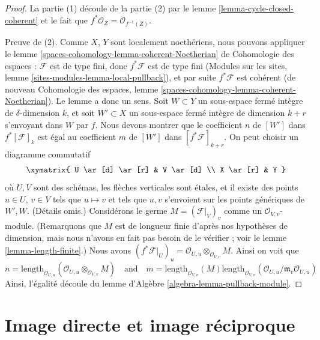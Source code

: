 \begin{proof}
La partie (1) découle de la partie (2) par le lemme
\ref{lemma-cycle-closed-coherent} et le fait que $f^*\mathcal{O}_Z =
\mathcal{O}_{f^{-1}(Z)}$.

\medskip\noindent
Preuve de (2). Comme $X$, $Y$ sont localement noethériens, nous pouvons
appliquer le lemme
\ref{spaces-cohomology-lemma-coherent-Noetherian} de Cohomologie des espaces :
$\mathcal{F}$ est de type fini, donc $f^*\mathcal{F}$ est de type fini (Modules
sur les sites, lemme \ref{sites-modules-lemma-local-pullback}), et par suite
$f^*\mathcal{F}$ est cohérent (de nouveau Cohomologie des espaces, lemme
\ref{spaces-cohomology-lemma-coherent-Noetherian}). Le lemme a donc un sens.
Soit $W \subset Y$ un sous-espace fermé intègre de $\delta$-dimension $k$, et
soit $W' \subset X$ un sous-espace fermé intègre de dimension $k + r$
s'envoyant dans $W$ par $f$. Nous devons montrer que le
coefficient $n$ de $[W']$ dans $f^*[{\mathcal F}]_k$ est égal au
coefficient $m$ de $[W']$ dans $[f^*{\mathcal F}]_{k+r}$. On peut choisir un
diagramme commutatif
$$
\xymatrix{
U \ar[d] \ar[r] & V \ar[d] \\
X \ar[r] & Y
}
$$
où $U, V$ sont des schémas, les flèches verticales sont \'etales, et il existe
des points $u \in U$, $v \in V$ tels que $u \mapsto v$ et tels que $u, v$
s'envoient sur les points génériques de $W', W$. (Détails omis.) Considérons le
germe $M = (\mathcal{F}|_V)_v$ comme un $\mathcal{O}_{V, v}$-module.
(Remarquons que $M$ est de longueur finie d'après nos hypothèses de dimension,
mais nous n'avons en fait pas besoin de le vérifier ; voir le lemme
\ref{lemma-length-finite}.) Nous avons $(f^*\mathcal{F}|_U)_u =
\mathcal{O}_{U, u} \otimes_{\mathcal{O}_{V, v}} M$. Ainsi on voit que
$$
n = \text{length}_{\mathcal{O}_{U, u}}
(\mathcal{O}_{U, u} \otimes_{\mathcal{O}_{V, v}} M)
\quad
\text{and}
\quad
m = \text{length}_{\mathcal{O}_{V, v}}(M)
\text{length}_{\mathcal{O}_{V, v}}(
\mathcal{O}_{U, u}/\mathfrak m_v \mathcal{O}_{U, u})
$$
Ainsi, l'égalité découle du lemme d'Algèbre
\ref{algebra-lemma-pullback-module}.
\end{proof}









\section{Image directe et image réciproque}
\label{section-push-pull}

